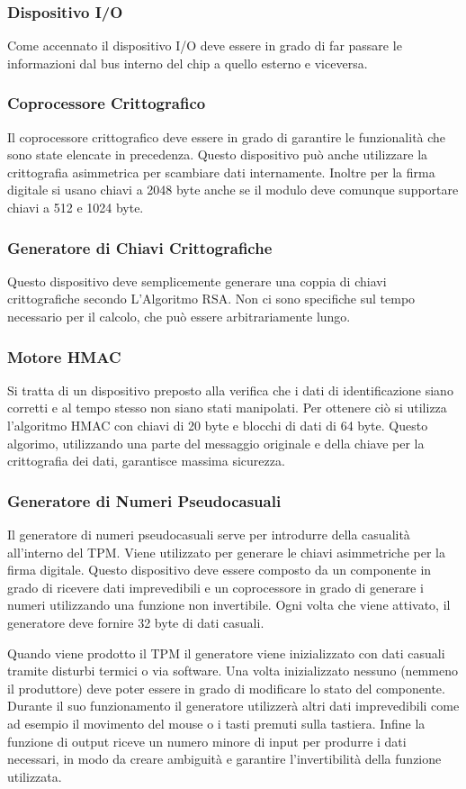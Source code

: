 \subsubsection{Dispositivo I/O}
Come accennato il dispositivo I/O deve essere in grado di far passare le informazioni dal bus interno del chip a quello esterno e viceversa.

\subsubsection{Coprocessore Crittografico}
Il coprocessore crittografico deve essere in grado di garantire le funzionalità che sono state elencate in precedenza. Questo dispositivo può anche utilizzare la crittografia asimmetrica per scambiare dati internamente. Inoltre per la firma digitale si usano chiavi a 2048 byte anche se il modulo deve comunque supportare chiavi a 512 e 1024 byte.

\subsubsection{Generatore di Chiavi Crittografiche}
Questo dispositivo deve semplicemente generare una coppia di chiavi crittografiche secondo L'Algoritmo RSA. Non ci sono specifiche sul tempo necessario per il calcolo, che può essere arbitrariamente lungo.

\subsubsection{Motore HMAC}
Si tratta di un dispositivo preposto alla verifica che i dati di identificazione siano corretti e al tempo stesso non siano stati manipolati. Per ottenere ciò si utilizza l'algoritmo HMAC con chiavi di 20 byte e blocchi di dati di 64 byte. Questo algorimo, utilizzando una parte del messaggio originale e della chiave per la crittografia dei dati, garantisce massima sicurezza.

\subsubsection{Generatore di Numeri Pseudocasuali}
Il generatore di numeri pseudocasuali serve per introdurre della casualità all'interno del TPM. Viene utilizzato per generare le chiavi asimmetriche per la firma digitale. Questo dispositivo deve essere composto da un componente in grado di ricevere dati imprevedibili e un coprocessore in grado di generare i numeri utilizzando una funzione non invertibile. Ogni volta che viene attivato, il generatore deve fornire 32 byte di dati casuali.

Quando viene prodotto il TPM il generatore viene inizializzato con dati casuali tramite disturbi termici o via software. Una volta inizializzato nessuno (nemmeno il produttore) deve poter essere in grado di modificare lo stato del componente. Durante il suo funzionamento il generatore utilizzerà altri dati imprevedibili come ad esempio il movimento del mouse o i tasti premuti sulla tastiera. Infine la funzione di output riceve un numero minore di input per produrre i dati necessari, in modo da creare ambiguità e garantire l'invertibilità della funzione utilizzata.
\cite{wiki_tpm}